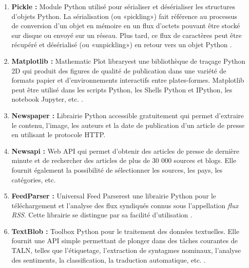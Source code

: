 \begin{enumerate}[leftmargin=*]
                \item{\textbf{Pickle : }}
                Module Python utilisé pour sérialiser et désérialiser les structures d'objets Python. La sérialisation (ou «pickling») fait référence au processus de conversion d'un objet en mémoire en un flux d'octets pouvant être stocké sur disque ou envoyé sur un réseau. Plus tard, ce flux de caractères peut être récupéré et désérialisé (ou «unpickling») en retour vers un objet Python \cite{pickle}.\\

                \item{\textbf{Matplotlib : }}
                \textquotedbl Mathematic Plot library\textquotedbl est une bibliothèque de traçage Python 2D qui produit des figures de qualité de publication dans une variété de formats papier et d'environnements interactifs entre plates-formes. Matplotlib peut être utilisé dans les scripts Python, les Shells Python et IPython, les notebook Jupyter, etc. \cite{matplotlib}.\\

                \item{\textbf{Newspaper : }}
                Librairie Python accessible gratuitement qui permet d'extraire le contenu, l'image, les auteurs et la date de publication d'un article de presse en utilisant le protocole HTTP.\\

                \item{\textbf{Newsapi : }}
                Web API qui permet d'obtenir des articles de presse de dernière minute et de rechercher des articles de plus de 30 000 sources et blogs. Elle fournit également la possibilité de sélectionner les sources, les pays, les catégories, etc.\\

                \item{\textbf{FeedParser : }}
                \textquotedbl Universal Feed Parser\textquotedbl est une librairie Python pour le téléchargement et l'analyse des flux syndiqués connus sous l'appellation \emph{flux RSS}. Cette librairie se distingue par sa facilité d'utilisation \cite{feedparser}.\\

                \item{\textbf{TextBlob : }}
                Toolbox Python pour le traitement des données textuelles. Elle fournit une API simple permettant de plonger dans des tâches courantes de TALN, telles que l'étiquetage, l'extraction de syntagmes nominaux, l'analyse des sentiments, la classification, la traduction automatique, etc. \cite{textblob}.\\


\end{enumerate}
